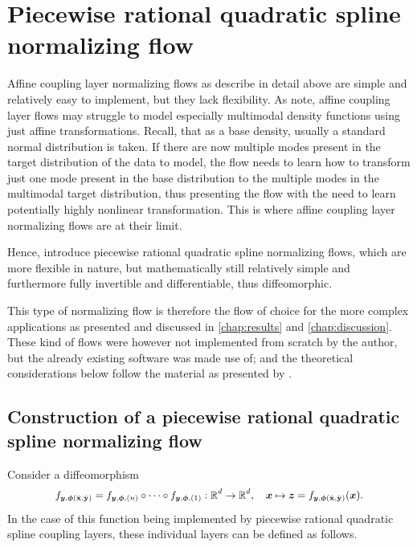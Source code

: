 \documentclass[a4paper,12pt]{report}
\begin{document}
\section{Piecewise rational quadratic spline normalizing flow}\label{subsec:normflowspiecewiserational}
Affine coupling layer normalizing flows as describe in detail above are simple and relatively easy to implement, but they lack flexibility. As \cite[p.3]{Durkan.10.06.2019} note, affine coupling layer flows may struggle to model especially multimodal density functions using just affine transformations. Recall, that as a base density, usually a standard normal distribution is taken. If there are now multiple modes present in the target distribution of the data to model, the flow needs to learn how to transform just one mode present in the base distribution to the multiple modes in the multimodal target distribution, thus presenting the flow with the need to learn potentially highly nonlinear transformation. This is where affine coupling layer normalizing flows are at their limit.

Hence, \cite[p.4]{Durkan.10.06.2019} introduce piecewise rational quadratic spline normalizing flows, which are more flexible in nature, but mathematically still relatively simple and furthermore fully invertible and differentiable, thus diffeomorphic.

This type of normalizing flow is therefore the flow of choice for the more complex applications as presented and discussed in \cref{chap:results} and \cref{chap:discussion}. These kind of flows were however not implemented from scratch by the author, but the already existing software \cite{nflows} was made use of; and the theoretical considerations below follow the material as presented by \cite{Durkan.10.06.2019}.

\subsection{Construction of a piecewise rational quadratic spline normalizing flow}
Consider a diffeomorphism \begin{align}\small\begin{aligned}
f_{\bm{y},\bm{\phi}(\hat{\boldsymbol{\mathbf{x}}},\hat{\boldsymbol{\mathbf{y}}})} = f_{\bm{y},\bm{\phi},(n)}\circ \dots \circ f_{\bm{y},\bm{\phi},(1)}: \mathbb{R}^d \rightarrow \mathbb{R}^d, \quad \bm{x} \mapsto \bm{z} = f_{\bm{y},\bm{\phi}(\hat{\boldsymbol{\mathbf{x}}},\hat{\boldsymbol{\mathbf{y}}})}(\bm{x}).
\end{aligned}\end{align} In the case of this function being implemented by piecewise rational quadratic spline coupling layers, these individual layers can be defined as follows.
\end{document}
